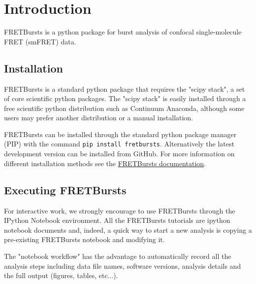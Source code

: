 \section{Introduction}

FRETBursts is a python package for burst analysis of confocal single-molecule FRET (smFRET) data.

\subsection{Installation}
FRETBursts is a standard python package that requires the "scipy stack", a set of core scientific python packages.
The "scipy stack" is easily installed through a free scientific python distribution such as Continuum Anaconda, although some users may prefer another distribution or a manual installation.

FRETBursts can be installed through the standard python package manager (PIP) with 
the command \verb|pip install fretbursts|. Alternatively the latest development version can be installed from GitHub.
For more information on different installation methods see the \href{http://fretbursts.readthedocs.org/en/latest/installation.html}{FRETBursts documentation}.

\subsection{Executing FRETBursts}
For interactive work, we strongly encourage to use FRETBursts through the IPython Notebook environment. All the FRETBursts tutorials are ipython notebook documents and, indeed, a quick way to start a new analysis is copying a pre-existing FRETBursts notebook and modifying it.

The "notebook workflow" has the advantage to automatically record all the analysis steps including
data file names, software versions, analysis details and the full output (figures, tables, etc...).
